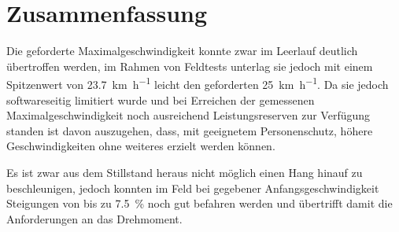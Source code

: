 \chapter{Zusammenfassung}
	Die geforderte Maximalgeschwindigkeit konnte zwar im Leerlauf deutlich übertroffen werden, im Rahmen von Feldtests unterlag sie jedoch mit einem Spitzenwert von \qty{23,7}{\kilo\metre\per\hour} leicht den geforderten \qty{25}{\kilo\metre\per\hour}.
	Da sie jedoch softwareseitig limitiert wurde und bei Erreichen der gemessenen Maximalgeschwindigkeit noch ausreichend Leistungsreserven zur Verfügung standen ist davon auszugehen, dass, mit geeignetem Personenschutz, höhere Geschwindigkeiten ohne weiteres erzielt werden können.

	Es ist zwar aus dem Stillstand heraus nicht möglich einen Hang hinauf zu beschleunigen, jedoch konnten im Feld bei gegebener Anfangsgeschwindigkeit Steigungen von bis zu \qty{7,5}{\percent} noch gut befahren werden und übertrifft damit die Anforderungen an das Drehmoment.\par\medskip
	